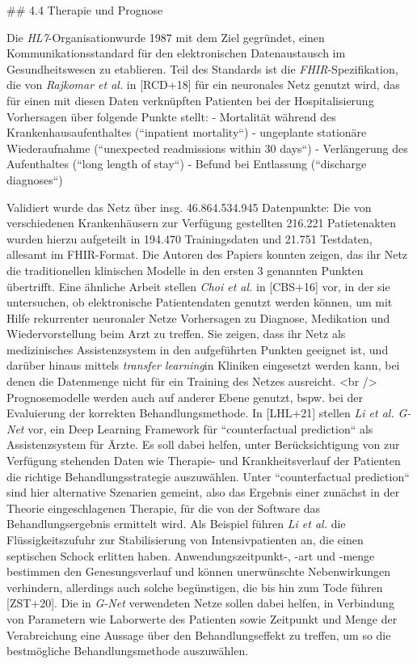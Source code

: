 ## 4.4 Therapie und Prognose

Die \textit{HL7}-Organisation\footnotemark[26] wurde 1987 mit dem Ziel gegründet, einen Kommunikationsstandard für den elektronischen Datenaustausch im Gesundheitswesen zu etablieren. Teil des Standards ist die \textit{FHIR}-Spezifikation\footnotemark[27], die von \textit{Rajkomar et al.} in [RCD+18] für ein neuronales Netz genutzt wird, das für einen mit diesen Daten verknüpften Patienten bei der Hospitalisierung Vorhersagen über folgende Punkte stellt:
- Mortalität während des Krankenhausaufenthaltes (``inpatient mortality``)
- ungeplante stationäre Wiederaufnahme (``unexpected readmissions within 30 days``)
- Verlängerung des Aufenthaltes (``long length of stay``)
- Befund bei Entlassung (``discharge diagnoses``)

Validiert wurde das Netz über insg. 46.864.534.945 Datenpunkte: Die von verschiedenen Krankenhäusern zur Verfügung gestellten 216.221 Patietenakten wurden hierzu aufgeteilt in 194.470 Trainingsdaten und 21.751 Testdaten, allesamt im FHIR-Format. Die Autoren des Papiers konnten zeigen, das ihr Netz die traditionellen klinischen Modelle in den ersten 3 genannten Punkten übertrifft. Eine ähnliche Arbeit stellen \textit{Choi et al.} in [CBS+16] vor, in der sie untersuchen, ob elektronische Patientendaten genutzt werden können, um mit Hilfe rekurrenter neuronaler Netze Vorhersagen zu Diagnose, Medikation und Wiedervorstellung beim Arzt zu treffen. Sie zeigen, dass ihr Netz als medizinisches Assistenzsystem in den aufgeführten Punkten geeignet ist, und darüber hinaus mittels \textit{transfer learning}\footnotemark[21] in Kliniken eingesetzt werden kann, bei denen die Datenmenge nicht für ein Training des Netzes ausreicht. <br />
Prognosemodelle werden auch auf anderer Ebene genutzt, bspw. bei der Evaluierung der korrekten Behandlungsmethode. In [LHL+21] stellen \textit{Li et al.} \textit{G-Net} vor, ein Deep Learning Framework für ``counterfactual prediction`` als Assistenzsystem für Ärzte. Es soll dabei helfen, unter Berücksichtigung von zur Verfügung stehenden Daten wie Therapie- und Krankheitsverlauf der Patienten die richtige Behandlungsstrategie auszuwählen. Unter ``counterfactual prediction`` sind hier alternative Szenarien gemeint, also das Ergebnis einer zunächst in der Theorie eingeschlagenen Therapie, für die von der Software das Behandlungsergebnis ermittelt wird\footnotemark[28]. Als Beispiel führen \textit{Li et al.} die Flüssigkeitszufuhr zur Stabilisierung von Intensivpatienten an, die einen septischen Schock erlitten haben. Anwendungszeitpunkt-, -art und -menge bestimmen den Genesungsverlauf und können unerwünschte Nebenwirkungen verhindern, allerdings auch solche begünstigen, die bis hin zum Tode führen [ZST+20]. Die in \textit{G-Net} verwendeten Netze sollen dabei helfen, in Verbindung von Parametern wie Laborwerte des Patienten sowie Zeitpunkt und Menge der Verabreichung eine Aussage über den Behandlungseffekt zu treffen\footnotemark[29], um so die bestmögliche Behandlungsmethode auszuwählen.

